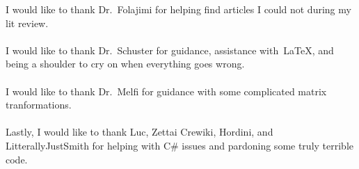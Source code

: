 \documentclass{wit-thesis}
\begin{document}
\listoftables


\listoffigures


\begin{acknowledgments}
  I would like to thank Dr.~Folajimi for helping find articles I could not during my lit review.\\\\
  I would like to thank Dr.~Schuster for guidance, assistance with~\LaTeX, and being a shoulder to cry on when everything goes wrong.\\\\
  I would like to thank Dr.~Melfi for guidance with some complicated matrix tranformations.\\\\
  Lastly, I would like to thank Luc, Zettai Crewiki, Hordini, and LitterallyJustSmith for helping with C\# issues and pardoning some truly terrible code.

\end{acknowledgments}



% 
% 


% 
% 
%




\end{document}
